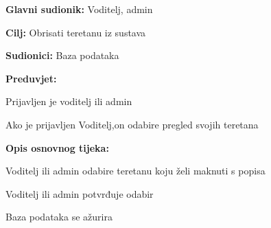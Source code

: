 					\noindent {}
					\begin{packed_item}
	
						\item \textbf{Glavni sudionik: } Voditelj, admin
						\item  \textbf{Cilj:} Obrisati teretanu iz sustava
						\item  \textbf{Sudionici:} Baza podataka
						\item  \textbf{Preduvjet:}
						\item[] \begin{packed_enum}
	
							\item Prijavljen je voditelj ili admin
							\item Ako je prijavljen Voditelj,on odabire pregled svojih teretana

						\end{packed_enum}
						\item  \textbf{Opis osnovnog tijeka:}
						
						\item[] \begin{packed_enum}
	
							\item Voditelj ili admin odabire teretanu koju želi maknuti s popisa
							\item Voditelj ili admin potvrđuje odabir
							\item Baza podataka se ažurira
						\end{packed_enum}
						
					\end{packed_item}
					
